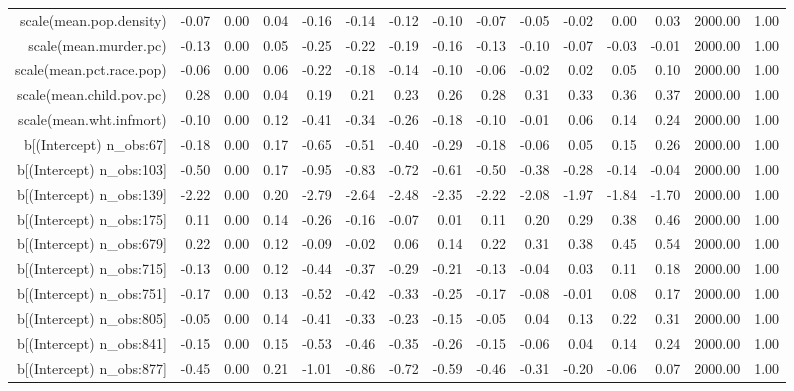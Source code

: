 \begin{table}[ht]
\begin{tabular}{rrrrrrrrrrrrrrr}
  scale(mean.pop.density) & -0.07 & 0.00 & 0.04 & -0.16 & -0.14 & -0.12 & -0.10 & -0.07 & -0.05 & -0.02 & 0.00 & 0.03 & 2000.00 & 1.00 \\ 
  scale(mean.murder.pc) & -0.13 & 0.00 & 0.05 & -0.25 & -0.22 & -0.19 & -0.16 & -0.13 & -0.10 & -0.07 & -0.03 & -0.01 & 2000.00 & 1.00 \\ 
  scale(mean.pct.race.pop) & -0.06 & 0.00 & 0.06 & -0.22 & -0.18 & -0.14 & -0.10 & -0.06 & -0.02 & 0.02 & 0.05 & 0.10 & 2000.00 & 1.00 \\ 
  scale(mean.child.pov.pc) & 0.28 & 0.00 & 0.04 & 0.19 & 0.21 & 0.23 & 0.26 & 0.28 & 0.31 & 0.33 & 0.36 & 0.37 & 2000.00 & 1.00 \\ 
  scale(mean.wht.infmort) & -0.10 & 0.00 & 0.12 & -0.41 & -0.34 & -0.26 & -0.18 & -0.10 & -0.01 & 0.06 & 0.14 & 0.24 & 2000.00 & 1.00 \\ 
  b[(Intercept) n\_obs:67] & -0.18 & 0.00 & 0.17 & -0.65 & -0.51 & -0.40 & -0.29 & -0.18 & -0.06 & 0.05 & 0.15 & 0.26 & 2000.00 & 1.00 \\ 
  b[(Intercept) n\_obs:103] & -0.50 & 0.00 & 0.17 & -0.95 & -0.83 & -0.72 & -0.61 & -0.50 & -0.38 & -0.28 & -0.14 & -0.04 & 2000.00 & 1.00 \\ 
  b[(Intercept) n\_obs:139] & -2.22 & 0.00 & 0.20 & -2.79 & -2.64 & -2.48 & -2.35 & -2.22 & -2.08 & -1.97 & -1.84 & -1.70 & 2000.00 & 1.00 \\ 
  b[(Intercept) n\_obs:175] & 0.11 & 0.00 & 0.14 & -0.26 & -0.16 & -0.07 & 0.01 & 0.11 & 0.20 & 0.29 & 0.38 & 0.46 & 2000.00 & 1.00 \\ 
  b[(Intercept) n\_obs:679] & 0.22 & 0.00 & 0.12 & -0.09 & -0.02 & 0.06 & 0.14 & 0.22 & 0.31 & 0.38 & 0.45 & 0.54 & 2000.00 & 1.00 \\ 
  b[(Intercept) n\_obs:715] & -0.13 & 0.00 & 0.12 & -0.44 & -0.37 & -0.29 & -0.21 & -0.13 & -0.04 & 0.03 & 0.11 & 0.18 & 2000.00 & 1.00 \\ 
  b[(Intercept) n\_obs:751] & -0.17 & 0.00 & 0.13 & -0.52 & -0.42 & -0.33 & -0.25 & -0.17 & -0.08 & -0.01 & 0.08 & 0.17 & 2000.00 & 1.00 \\ 
  b[(Intercept) n\_obs:805] & -0.05 & 0.00 & 0.14 & -0.41 & -0.33 & -0.23 & -0.15 & -0.05 & 0.04 & 0.13 & 0.22 & 0.31 & 2000.00 & 1.00 \\ 
  b[(Intercept) n\_obs:841] & -0.15 & 0.00 & 0.15 & -0.53 & -0.46 & -0.35 & -0.26 & -0.15 & -0.06 & 0.04 & 0.14 & 0.24 & 2000.00 & 1.00 \\ 
  b[(Intercept) n\_obs:877] & -0.45 & 0.00 & 0.21 & -1.01 & -0.86 & -0.72 & -0.59 & -0.46 & -0.31 & -0.20 & -0.06 & 0.07 & 2000.00 & 1.00 \\ 

\end{tabular}
\end{table}
